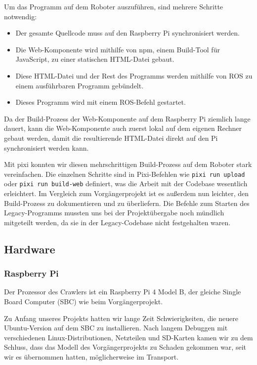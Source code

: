 Um das Programm auf dem Roboter auszuführen, sind mehrere Schritte notwendig:
\begin{itemize}
	\item Der gesamte Quellcode muss auf den Raspberry Pi synchronisiert werden.
	\item Die Web-Komponente wird mithilfe von npm, einem Build-Tool für JavaScript, zu einer statischen HTML-Datei gebaut.
	\item Diese HTML-Datei und der Rest des Programms werden mithilfe von ROS zu einem ausführbaren Programm gebündelt.
	\item Dieses Programm wird mit einem ROS-Befehl gestartet.
\end{itemize}

Da der Build-Prozess der Web-Komponente auf dem Raspberry Pi ziemlich lange dauert, kann die Web-Komponente auch zuerst lokal auf dem eigenen Rechner gebaut werden, damit die resultierende HTML-Datei direkt auf den Pi synchronisiert werden kann.

Mit pixi konnten wir diesen mehrschrittigen Build-Prozess auf dem Roboter stark vereinfachen. Die einzelnen Schritte sind in Pixi-Befehlen wie \texttt{pixi run upload} oder \texttt{pixi run build-web} definiert, was die Arbeit mit der Codebase wesentlich erleichtert. Im Vergleich zum Vorgängerprojekt ist es außerdem nun leichter, den Build-Prozess zu dokumentieren und zu überliefern. Die Befehle zum Starten des Legacy-Programms mussten uns bei der Projektübergabe noch mündlich mitgeteilt werden, da sie in der Legacy-Codebase nicht festgehalten waren.

\subsection{Hardware}

\subsubsection{Raspberry Pi}

Der Prozessor des Crawlers ist ein Raspberry Pi 4 Model B, der gleiche Single Board Computer (SBC) wie beim Vorgängerprojekt.

Zu Anfang unseres Projekts hatten wir lange Zeit Schwierigkeiten, die neuere Ubuntu-Version auf dem SBC zu installieren. Nach langem Debuggen mit verschiedenen Linux-Distributionen, Netzteilen und SD-Karten kamen wir zu dem Schluss, dass das Modell des Vorgängerprojekts zu Schaden gekommen war, seit wir es übernommen hatten, möglicherweise im Transport.
